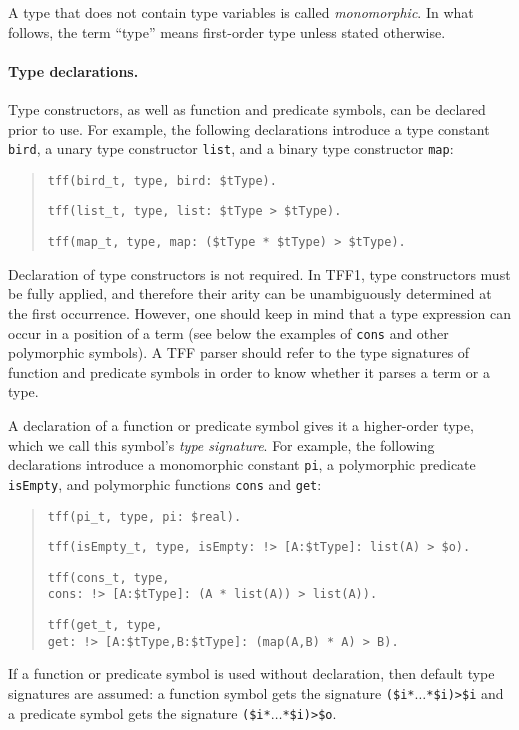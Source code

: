A type that does not contain type variables is called
{\em monomorphic}.
In what follows, the term ``type'' means
first-order type unless stated otherwise.

\paragraph{Type declarations.} Type constructors, as well as
function and predicate symbols, can be declared prior to use.
For example, the following declarations introduce a type
constant {\tt bird}, a unary type constructor {\tt list},
and a binary type constructor {\tt map}:
\begin{quote}
\verb+tff(bird_t, type, bird: $tType).+
\par\medskip
\verb+tff(list_t, type, list: $tType > $tType).+
\par\medskip
\verb+tff(map_t, type, map: ($tType * $tType) > $tType).+
\end{quote}
Declaration of type constructors is not required. In TFF1,
type constructors must be fully applied, and therefore
their arity can be unambiguously determined at the first
occurrence. However, one should keep in mind that a type
expression can occur in a position of a term (see below
the examples of {\tt cons} and other polymorphic symbols).
A TFF parser should refer to the type signatures of function
and predicate symbols in order to know whether it parses
a term or a type.

A declaration of a function or predicate symbol gives it
a higher-order type, which we call this symbol's
{\em type signature}. For example, the following
declarations introduce a monomorphic constant {\tt pi},
a polymorphic predicate {\tt isEmpty}, and polymorphic
functions {\tt cons} and {\tt get}:
\begin{quote}
\verb+tff(pi_t, type, pi: $real).+
\par\medskip
\verb+tff(isEmpty_t, type, isEmpty: !> [A:$tType]: list(A) > $o).+
\par\medskip
\verb+tff(cons_t, type,+\\
\mbox{}\hfill
\verb+cons: !> [A:$tType]: (A * list(A)) > list(A)).+
\par\medskip
\verb+tff(get_t, type,+\\
\mbox{}\hfill
\verb+get: !> [A:$tType,B:$tType]: (map(A,B) * A) > B).+
\end{quote}
If a function or predicate symbol is used without declaration,
then default type signatures are assumed:
a function symbol gets the signature
{\tt (\$i\;*\;${\dots}$\;*\;\$i)\;>\;\$i} and
a predicate symbol gets the signature
{\tt (\$i\;*\;${\dots}$\;*\;\$i)\;>\;\$o}.

